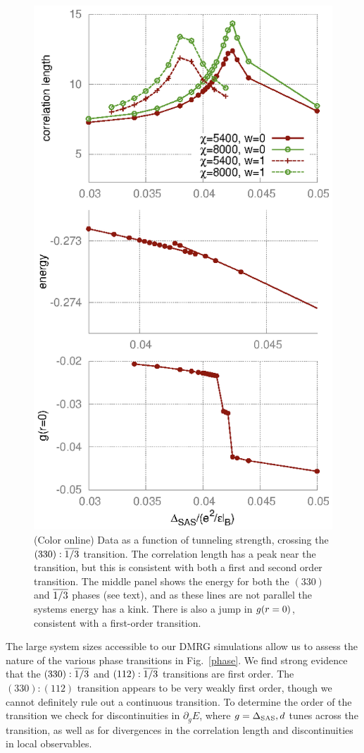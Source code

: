 \begin{figure}%
	\includegraphics[width=0.6\linewidth]{figures/B.eps}
	\caption{\label{Bplots} (Color online) Data as a function of tunneling strength, crossing the $(330):\overline{1/3}$ transition. The correlation length has a peak near the transition, but this is consistent with both a first and second order transition. The middle panel shows the energy for both the $(330)$ and $\overline{1/3}$ phases (see text), and as these lines are not parallel the systems energy has a kink. There is also a jump in ${g}(r=0)$, consistent with a first-order transition. }
\end{figure}

The large system sizes accessible to our DMRG simulations allow us to assess the nature of the various phase transitions in Fig.~\ref{phase}. 
We find strong evidence that the $(330):\overline{1/3}$ and $ (112):\overline{1/3}$ transitions are first order. The $(330):(112)$ transition appears to be very weakly first order, though we cannot definitely rule out a continuous transition.
To determine the order of the transition we check for discontinuities in $\partial_g E$, where $g = \Delta_\textrm{SAS}, d$ tunes across the transition, as well as for divergences in the correlation length and discontinuities in local observables.

